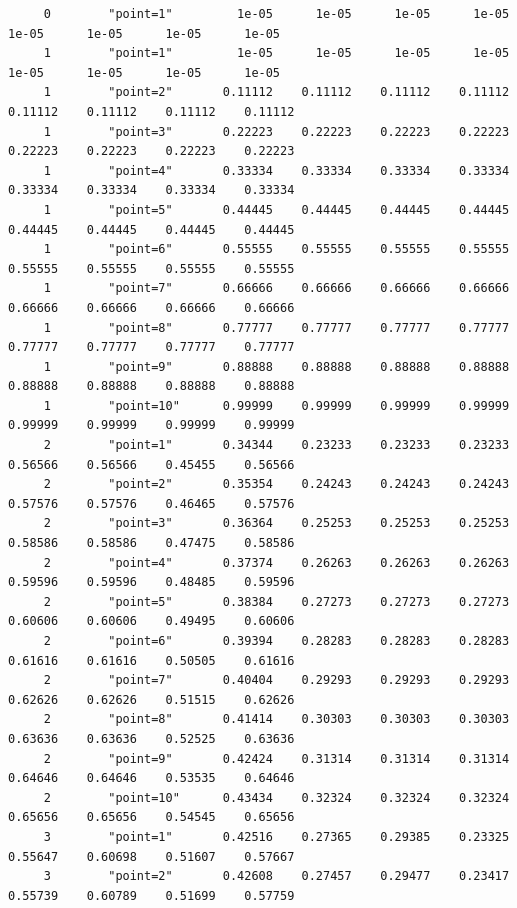 \documentclass[
]{book}
\begin{document}
\begin{verbatim}
     0        "point=1"         1e-05      1e-05      1e-05      1e-05      1e-05      1e-05      1e-05      1e-05
     1        "point=1"         1e-05      1e-05      1e-05      1e-05      1e-05      1e-05      1e-05      1e-05
     1        "point=2"       0.11112    0.11112    0.11112    0.11112    0.11112    0.11112    0.11112    0.11112
     1        "point=3"       0.22223    0.22223    0.22223    0.22223    0.22223    0.22223    0.22223    0.22223
     1        "point=4"       0.33334    0.33334    0.33334    0.33334    0.33334    0.33334    0.33334    0.33334
     1        "point=5"       0.44445    0.44445    0.44445    0.44445    0.44445    0.44445    0.44445    0.44445
     1        "point=6"       0.55555    0.55555    0.55555    0.55555    0.55555    0.55555    0.55555    0.55555
     1        "point=7"       0.66666    0.66666    0.66666    0.66666    0.66666    0.66666    0.66666    0.66666
     1        "point=8"       0.77777    0.77777    0.77777    0.77777    0.77777    0.77777    0.77777    0.77777
     1        "point=9"       0.88888    0.88888    0.88888    0.88888    0.88888    0.88888    0.88888    0.88888
     1        "point=10"      0.99999    0.99999    0.99999    0.99999    0.99999    0.99999    0.99999    0.99999
     2        "point=1"       0.34344    0.23233    0.23233    0.23233    0.56566    0.56566    0.45455    0.56566
     2        "point=2"       0.35354    0.24243    0.24243    0.24243    0.57576    0.57576    0.46465    0.57576
     2        "point=3"       0.36364    0.25253    0.25253    0.25253    0.58586    0.58586    0.47475    0.58586
     2        "point=4"       0.37374    0.26263    0.26263    0.26263    0.59596    0.59596    0.48485    0.59596
     2        "point=5"       0.38384    0.27273    0.27273    0.27273    0.60606    0.60606    0.49495    0.60606
     2        "point=6"       0.39394    0.28283    0.28283    0.28283    0.61616    0.61616    0.50505    0.61616
     2        "point=7"       0.40404    0.29293    0.29293    0.29293    0.62626    0.62626    0.51515    0.62626
     2        "point=8"       0.41414    0.30303    0.30303    0.30303    0.63636    0.63636    0.52525    0.63636
     2        "point=9"       0.42424    0.31314    0.31314    0.31314    0.64646    0.64646    0.53535    0.64646
     2        "point=10"      0.43434    0.32324    0.32324    0.32324    0.65656    0.65656    0.54545    0.65656
     3        "point=1"       0.42516    0.27365    0.29385    0.23325    0.55647    0.60698    0.51607    0.57667
     3        "point=2"       0.42608    0.27457    0.29477    0.23417    0.55739    0.60789    0.51699    0.57759

\end{verbatim}
\end{document}
